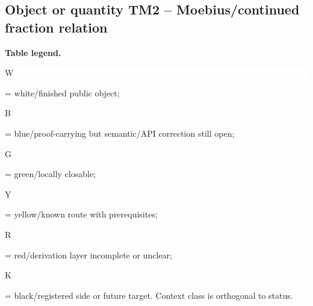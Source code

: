 \subsection*{Object or quantity TM2 -- Moebius/\allowbreak{}continued fraction relation}
\hypertarget{objproof:TM2}{}
\par\smallskip\noindent\begin{minipage}{0.99\linewidth}\footnotesize\raggedright\textbf{Table legend.} \colorbox{white}{\strut W} = white/finished public object; \colorbox{cyan!20}{\strut B} = blue/proof-carrying but semantic/API correction still open; \colorbox{green!18}{\strut G} = green/locally closable; \colorbox{yellow!25}{\strut Y} = yellow/known route with prerequisites; \colorbox{red!20}{\strut R} = red/derivation layer incomplete or unclear; \colorbox{black!18}{\strut K} = black/registered side or future target. Context class is orthogonal to status.\end{minipage}\par\vspace{0.25em}
